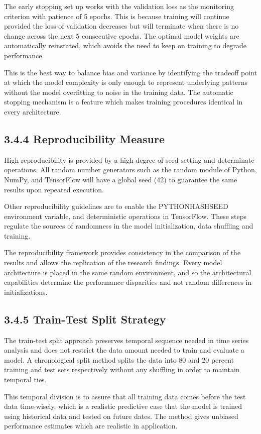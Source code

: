 \documentclass[12pt,a4paper]{report}
\begin{document}
The early stopping set up works with the validation loss as the monitoring criterion with patience of 5 epochs. This is because training will continue provided the loss of validation decreases but will terminate when there is no change across the next 5 consecutive epochs. The optimal model weights are automatically reinstated, which avoids the need to keep on training to degrade performance.

This is the best way to balance bias and variance by identifying the tradeoff point at which the model complexity is only enough to represent underlying patterns without the model overfitting to noise in the training data. The automatic stopping mechanism is a feature which makes training procedures identical in every architecture.

\subsection{3.4.4 Reproducibility Measure}
High reproducibility is provided by a high degree of seed setting and determinate operations. All random number generators such as the random module of Python, NumPy, and TensorFlow will have a global seed (42) to guarantee the same results upon repeated execution.

Other reproducibility guidelines are to enable the PYTHONHASHSEED environment variable, and deterministic operations in TensorFlow. These steps regulate the sources of randomness in the model initialization, data shuffling and training.

The reproducibility framework provides consistency in the comparison of the results and allows the replication of the research findings. Every model architecture is placed in the same random environment, and so the architectural capabilities determine the performance disparities and not random differences in initializations.

\subsection{3.4.5 Train-Test Split Strategy}
The train-test split approach preserves temporal sequence needed in time series analysis and does not restrict the data amount needed to train and evaluate a model. A chronological split method splits the data into 80 and 20 percent training and test sets respectively without any shuffling in order to maintain temporal ties.

This temporal division is to assure that all training data comes before the test data time-wisely, which is a realistic predictive case that the model is trained using historical data and tested on future dates. The method gives unbiased performance estimates which are realistic in application.
\end{document}
